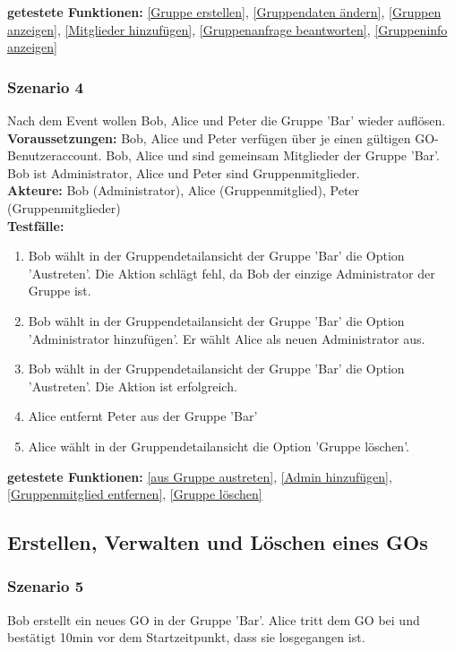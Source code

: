 \documentclass[parskip=full]{scrartcl}
\def\threedigits#1{%
  \ifnum#1<100 0\fi
  \ifnum#1<10 0\fi
  \number#1}
\begin{document}
\textbf{getestete Funktionen: }\ref{Gruppe erstellen}, \ref{Gruppendaten ändern}, \ref{Gruppen anzeigen}, \ref{Mitglieder hinzufügen}, \ref{Gruppenanfrage beantworten}, \ref{Gruppeninfo anzeigen}

\subsubsection*{Szenario 4}Nach dem Event wollen Bob, Alice und Peter die Gruppe 'Bar' wieder auflösen.\\

\textbf{Voraussetzungen: }Bob, Alice und Peter verfügen über je einen gültigen GO-Benutzeraccount. Bob, Alice und sind gemeinsam Mitglieder der Gruppe 'Bar'. Bob ist Administrator, Alice und Peter sind Gruppenmitglieder.\\

\textbf{Akteure:} Bob (Administrator), Alice (Gruppenmitglied), Peter (Gruppenmitglieder) \\

\textbf{Testfälle:}
\begin{enumerate}[label={\textbf{/T\protect\threedigits{\theenumi}0/}}, leftmargin=*, resume]
	\item Bob wählt in der Gruppendetailansicht der Gruppe 'Bar' die Option 'Austreten'. Die Aktion schlägt fehl, da Bob der einzige Administrator der Gruppe ist.
	\item Bob wählt in der Gruppendetailansicht der Gruppe 'Bar' die Option 'Administrator hinzufügen'. Er wählt Alice als neuen Administrator aus.
	\item Bob wählt in der Gruppendetailansicht der Gruppe 'Bar' die Option 'Austreten'. Die Aktion ist erfolgreich.
	\item Alice entfernt Peter aus der Gruppe 'Bar'
	\item Alice wählt in der Gruppendetailansicht die Option 'Gruppe löschen'.
\end{enumerate}

\textbf{getestete Funktionen: }\ref{aus Gruppe austreten}, \ref{Admin hinzufügen}, \ref{Gruppenmitglied entfernen}, \ref{Gruppe löschen}

\subsection{Erstellen, Verwalten und Löschen eines GOs}

\subsubsection*{Szenario 5}Bob erstellt ein neues GO in der Gruppe 'Bar'. Alice tritt dem GO bei und bestätigt 10min vor dem Startzeitpunkt, dass sie losgegangen ist.\\
\end{document}
